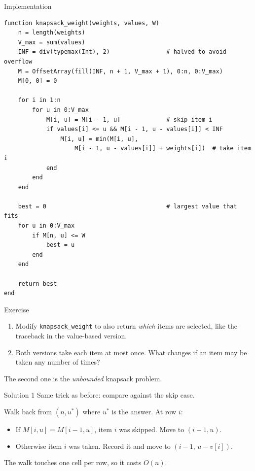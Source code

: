 \documentclass[10pt,aspectratio=169]{beamer}
\begin{document}
\begin{frame}[fragile]{Implementation}
  \begin{lstlisting}[basicstyle=\ttfamily\scriptsize]
function knapsack_weight(weights, values, W)
    n = length(weights)
    V_max = sum(values)
    INF = div(typemax(Int), 2)                # halved to avoid overflow
    M = OffsetArray(fill(INF, n + 1, V_max + 1), 0:n, 0:V_max)
    M[0, 0] = 0

    for i in 1:n
        for u in 0:V_max
            M[i, u] = M[i - 1, u]             # skip item i
            if values[i] <= u && M[i - 1, u - values[i]] < INF
                M[i, u] = min(M[i, u],
                    M[i - 1, u - values[i]] + weights[i])  # take item i
            end
        end
    end

    best = 0                                  # largest value that fits
    for u in 0:V_max
        if M[n, u] <= W
            best = u
        end
    end

    return best
end
  \end{lstlisting}
\end{frame}

\begin{frame}{Exercise}
  \begin{enumerate}
    \item Modify \texttt{knapsack\_weight} to also return \emph{which} items are
          selected, like the traceback in the value-based version.
    \bigskip
    \item Both versions take each item at most once. What changes if an item may
          be taken \alert{any number of times}?
  \end{enumerate}

  \bigskip
  \begin{center}
    \small The second one is the \emph{unbounded} knapsack problem.
  \end{center}
\end{frame}

\begin{frame}{Solution 1}
  Same trick as before: compare against the skip case.

  \bigskip
  Walk back from $(n, u^{*})$ where $u^{*}$ is the answer. At row $i$:

  \begin{itemize}
    \item If $M[i,u] = M[i-1,u]$, item $i$ was skipped. Move to $(i-1, u)$.
    \item Otherwise item $i$ was taken. Record it and move to $(i-1,\, u - v[i])$.
  \end{itemize}

  \bigskip
  \begin{center}
    \small The walk touches one cell per row, so it costs $O(n)$.
  \end{center}
\end{frame}
\end{document}
